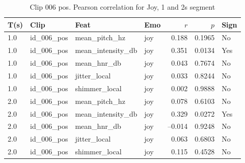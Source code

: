 \begin{table}[ht]
  \centering
  \begin{tabular}{l l l l r r l}
    \toprule
    T(s) & Clip           & Feat             & Emo & $r$ & $p$ & Sign \\
    \midrule
    1.0  & id\_006\_pos   & mean\_pitch\_hz       & joy     & 0.188      & 0.1965 & No \\
    1.0  & id\_006\_pos   & mean\_intensity\_db   & joy     & 0.351      & 0.0134 & Yes \\
    1.0  & id\_006\_pos   & mean\_hnr\_db         & joy     & 0.043      & 0.7674 & No \\
    1.0  & id\_006\_pos   & jitter\_local         & joy     & 0.033      & 0.8244 & No \\
    1.0  & id\_006\_pos   & shimmer\_local        & joy     & 0.002      & 0.9888 & No \\
    2.0  & id\_006\_pos   & mean\_pitch\_hz     & joy     &  0.078 & 0.6103 & No \\
    2.0  & id\_006\_pos   & mean\_intensity\_db & joy     &  0.329 & 0.0272 & Yes \\
    2.0  & id\_006\_pos   & mean\_hnr\_db       & joy     & –0.014 & 0.9248 & No \\
    2.0  & id\_006\_pos   & jitter\_local       & joy     &  0.063 & 0.6803 & No \\
    2.0  & id\_006\_pos   & shimmer\_local      & joy     &  0.115 & 0.4528 & No \\
    \bottomrule
  \end{tabular}
  \caption{Clip 006 pos. Pearson correlation for Joy, 1 and 2s segment}
  \label{tab:clip006_pos_stats_pear}
\end{table}

